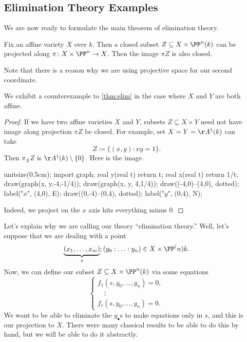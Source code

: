 \subsection{Elimination Theory Examples}
We are now ready to formulate the main theorem of elimination theory.
\begin{theorem} \label{thm:elim}
	Fix an affine variety $X$ over $k$. Then a closed subset $Z\subseteq X\times\PP^n(k)$ can be projected along $\pi\colon X\times\PP^n\to X$. Then the image $\pi Z$ is also closed.
\end{theorem}
Note that there is a reason why we are using projective space for our second coordinate.
\begin{exe} \label{exe:elimnex}
	We exhibit a counterexample to \autoref{thm:elim} in the case where $X$ and $Y$ are both affine.
\end{exe}
\begin{proof}
	If we have two affine varieties $X$ and $Y$, subsets $Z\subseteq X\times Y$ need not have image along projection $\pi Z$ be closed. For example, set $X=Y=\AA^1(k)$ can take
	\[Z\coloneqq\{(x,y):xy=1\}.\]
	Then $\pi_XZ$ is $\AA^1(k)\setminus\{0\}$. Here is the image.
	\begin{center}
		\begin{asy}
			unitsize(0.5cm);
			import graph;
			real y(real t)
			{
				return t;
			}
			real x(real t)
			{
				return 1/t;
			}
			draw(graph(x, y,-4,-1/4));
			draw(graph(x, y, 4,1/4));
			draw((-4,0)--(4,0), dotted); label("$x$", (4,0), E);
			draw((0,-4)--(0,4), dotted); label("$y$", (0,4), N);
		\end{asy}
	\end{center}
	Indeed, we project on the $x$ axis hits everything minus $0$.
\end{proof}
Let's explain why we are calling our theory ``elimination theory.'' Well, let's suppose that we are dealing with a point
\[\underbrace{(x_1,\ldots,x_m)}_s;(y_0:\ldots:y_n)\in X\times\PP^(n)k.\]
Now, we can define our subset $Z\subseteq X\times\PP^n(k)$ via some equations
\[\begin{cases}
	f_1(s,y_0,\ldots,y_n)=0, \\
	\quad\vdots \\
	f_r(s,y_0,\ldots,y_n)=0.
\end{cases}\]
We want to be able to eliminate the $y_\bullet$s to make equations only in $s$, and this is our projection to $X$. There were many classical results to be able to do this by hand, but we will be able to do it abstractly.

